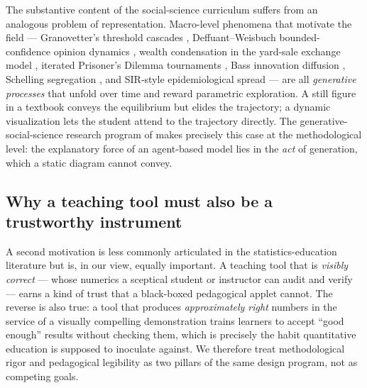 The substantive content of the social-science curriculum suffers from an
analogous problem of representation. Macro-level phenomena that motivate
the field --- Granovetter's threshold cascades \citep{granovetter1978},
Deffuant--Weisbuch bounded-confidence opinion dynamics
\citep{deffuant2000}, wealth condensation in the yard-sale exchange
model \citep{chakraborti2002, boghosian2014}, iterated Prisoner's
Dilemma tournaments \citep{axelrod1984}, Bass innovation diffusion
\citep{bass1969, rogers2003}, Schelling segregation
\citep{schelling1971}, and SIR-style epidemiological spread
\citep{kermack1927, newman2002} --- are all \emph{generative processes}
that unfold over time and reward parametric exploration. A still figure
in a textbook conveys the equilibrium but elides the trajectory; a
dynamic visualization lets the student attend to the trajectory
directly. The generative-social-science research program of
\citet{epstein2006} makes precisely this case at the methodological
level: the explanatory force of an agent-based model lies in the
\emph{act} of generation, which a static diagram cannot convey.

\subsection{Why a teaching tool must also be a trustworthy
instrument}\label{why-a-teaching-tool-must-also-be-a-trustworthy-instrument}

A second motivation is less commonly articulated in the
statistics-education literature but is, in our view, equally important.
A teaching tool that is \emph{visibly correct} --- whose numerics a
sceptical student or instructor can audit and verify --- earns a kind of
trust that a black-boxed pedagogical applet cannot. The reverse is also
true: a tool that produces \emph{approximately right} numbers in the
service of a visually compelling demonstration trains learners to accept
``good enough'' results without checking them, which is precisely the
habit quantitative education is supposed to inoculate against. We
therefore treat methodological rigor and pedagogical legibility as two
pillars of the same design program, not as competing goals.

